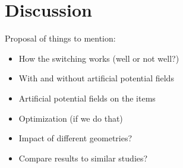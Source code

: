 \section{Discussion}

Proposal of things to mention: 
\begin{itemize}
    \item How the switching works (well or not well?) 
    \item With and without artificial potential fields
    \item Artificial potential fields on the items
    \item Optimization (if we do that)
    \item Impact of different geometries? 
    \item Compare results to similar studies? 
\end{itemize}